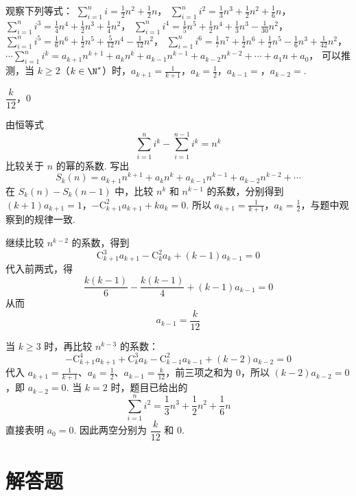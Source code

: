 \begin{problem}
观察下列等式：
\( \sum_{i=1}^{n} i = \frac{1}{2} n^{2} + \frac{1}{2} n \)，
\( \sum_{i=1}^{n} i^{2} = \frac{1}{3} n^{3} + \frac{1}{2} n^{2} + \frac{1}{6} n \)，
\( \sum_{i=1}^{n} i^{3} = \frac{1}{4} n^{4} + \frac{1}{2} n^{3} + \frac{1}{4} n^{2} \)，
\( \sum_{i=1}^{n} i^{4} = \frac{1}{5} n^{5} + \frac{1}{2} n^{4} + \frac{1}{3} n^{3} - \frac{1}{30} n^{2} \)，
\( \sum_{i=1}^{n} i^{5} = \frac{1}{6} n^{6} + \frac{1}{2} n^{5} + \frac{5}{12} n^{4} - \frac{1}{12} n^{2} \)，
\( \sum_{i=1}^{n} i^{6} = \frac{1}{7} n^{7} + \frac{1}{2} n^{6} + \frac{1}{2} n^{5} - \frac{1}{6} n^{3} + \frac{1}{42} n^{2} \)，
\(\cdots \sum_{i=1}^{n} i^{k} = a_{k+1} n^{k+1} + a_{k} n^{k} + a_{k-1} n^{k-1} + a_{k-2} n^{k-2} + \cdots + a_{1} n + a_{0}\)，
可以推测，当 \( k \geqslant 2 \)（\( k \in \N^{*} \)）时，\( a_{k+1} = \frac{1}{k+1} \)，\( a_{k} = \frac{1}{2} \)，\( a_{k-1} = \)\fillinblank{}，\( a_{k-2} = \)\fillinblank{}.
\end{problem}

\begin{answer}
\(\dfrac{k}{12}\)，\(0\)
\end{answer}

\begin{solution}
由恒等式
\[
\sum_{i=1}^{n}i^k-\sum_{i=1}^{n-1}i^k=n^k
\]
比较关于 \(n\) 的幂的系数. 写出
\[
S_k(n)=a_{k+1}n^{k+1}+a_kn^k+a_{k-1}n^{k-1}+a_{k-2}n^{k-2}+\cdots
\]
在 \(S_k(n)-S_k(n-1)\) 中，比较 \(n^k\) 和 \(n^{k-1}\) 的系数，分别得到
\((k+1)a_{k+1}=1\)，\(-\mathrm C_{k+1}^{2}a_{k+1}+ka_k=0\).
所以 \(a_{k+1}=\frac1{k+1}\)，\(a_k=\frac12\)，与题中观察到的规律一致.

继续比较 \(n^{k-2}\) 的系数，得到
\[
\mathrm C_{k+1}^{3}a_{k+1}-\mathrm C_{k}^{2}a_k+(k-1)a_{k-1}=0
\]
代入前两式，得
\[
\frac{k(k-1)}6-\frac{k(k-1)}4+(k-1)a_{k-1}=0
\]
从而
\[
a_{k-1}=\frac{k}{12}
\]

当 \(k\geqslant3\) 时，再比较 \(n^{k-3}\) 的系数：
\[
-\mathrm C_{k+1}^{4}a_{k+1}
+\mathrm C_{k}^{3}a_k
-\mathrm C_{k-1}^{2}a_{k-1}
+(k-2)a_{k-2}=0
\]
代入 \(a_{k+1}=\frac1{k+1}\)、\(a_k=\frac12\)、\(a_{k-1}=\frac{k}{12}\)，前三项之和为 \(0\)，所以 \((k-2)a_{k-2}=0\)，即 \(a_{k-2}=0\). 当 \(k=2\) 时，题目已给出的
\[
\sum_{i=1}^{n}i^2=\frac13n^3+\frac12n^2+\frac16n
\]
直接表明 \(a_0=0\). 因此两空分别为 \(\dfrac{k}{12}\) 和 \(0\).
\end{solution}

\section{解答题}

